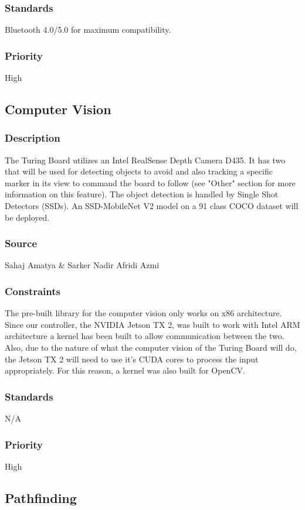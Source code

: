 \subsubsection{Standards}
Bluetooth 4.0/5.0 for maximum compatibility.
\subsubsection{Priority}
High

\subsection{Computer Vision}
\subsubsection{Description}
The Turing Board utilizes an Intel RealSense Depth Camera D435. It has two that will be used for detecting objects to avoid and also tracking a specific marker in its view to command the board to follow (see "Other" section for more information on this feature). The object detection is handled by Single Shot Detectors (SSDs). An SSD-MobileNet V2 model on a 91 class COCO dataset will be deployed.
\subsubsection{Source}
Sahaj Amatya & Sarker Nadir Afridi Azmi
\subsubsection{Constraints}
The pre-built library for the computer vision only works on x86 architecture. Since our controller, the NVIDIA Jetson TX 2, was built to work with Intel ARM architecture a kernel has been built to allow communication between the two.
Also, due to the nature of what the computer vision of the Turing Board will do, the Jetson TX 2 will need to use it's CUDA cores to process the input appropriately. For this reason, a kernel was also built for OpenCV.
\subsubsection{Standards}
N/A
\subsubsection{Priority}
High

\subsection{Pathfinding}
